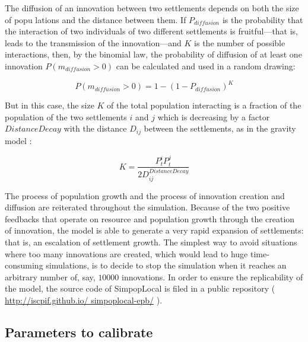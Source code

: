 The diffusion of an innovation between two settlements depends on both the size of popu­ lations and the distance between them. If $P_{diffusion}$ is the probability that the interaction of two individuals of two different settlements is fruitful—that is, leads to the transmission of the innovation—and $K$ is the number of possible interactions, then, by the binomial law, the probability of diffusion of at least one innovation $P ( m_{diffusion} > 0)$ can be calculated and used in a random drawing:

\begin{equation}
P (m_{diffusion} > 0 ) = 1 - ( 1 - P_{diffusion})^{K}
\end{equation}

But in this case, the size $K$ of the total population interacting is a fraction of the population of the two settlements $i$ and $j$ which is decreasing by a factor $DistanceDecay$ with the distance $D_{ij}$ between the settlements, as in the gravity model \autocite{Wilson1971}:

\begin{equation}
K = \frac{P^{i}_{t} P^{j}_{t}}{ 2 D^{DistanceDecay}_{ij}}
\end{equation}

The process of population growth and the process of innovation creation and diffusion are reiterated throughout the simulation. Because of the two positive feedbacks that operate on resource and population growth through the creation of innovation, the model is able to generate a very rapid expansion of settlements: that is, an escalation of settlement growth. The simplest way to avoid situations where too many innovations are created, which would lead to huge time-consuming simulations, is to decide to stop the simulation when it reaches an arbitrary number of, say, $\num{10000}$ innovations. In order to ensure the replicability of the model, the source code of SimpopLocal is filed in a public repository ( \href{http://iscpif.github.io/ simpoplocal-epb/}{http://iscpif.github.io/ simpoplocal-epb/} ).


\subsection{Parameters to calibrate}
\label{subsec:parameters}

